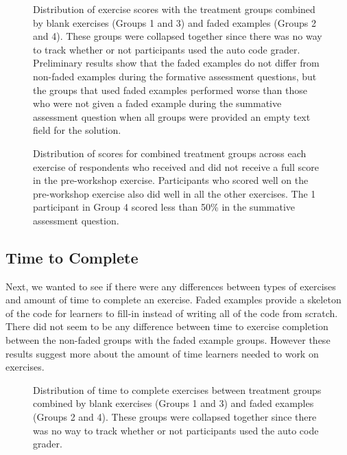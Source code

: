 \documentclass[acmsmall]{acmart}
\begin{document}
\begin{figure}[!hbtp]
	\centering
	\caption[Graded Exercise Scores with combined treatment groups]
	{Distribution of exercise scores with the treatment groups combined by
		blank exercises (Groups 1 and 3) and faded examples (Groups 2 and 4).
		These groups were collapsed together since there was no way to track whether or not
		participants used the auto code grader.
		Preliminary results show that the faded examples do not differ from non-faded examples during
		the formative assessment questions,
		but the groups that used faded examples performed worse than those who were not given a faded example
		during the summative assessment question when all groups were provided an empty text field for the solution.
	}
	\label{fig:exercise-scores-combined-treatments}
\end{figure}

\begin{figure}[!hbtp]
	\centering
	\caption[Exercise scores of full scores and non full scores in pre-workshop exercise by combined treatment]
	{Distribution of scores for combined treatment groups across each exercise of
		respondents who received and did not receive a full score in the pre-workshop exercise.
		Participants who scored well on the pre-workshop exercise also did well in all the other exercises.
		The 1 participant in Group 4 scored less than 50\% in the summative assessment question.
	}
	\label{fig:exercise-scores-combined-groups-pre100}
\end{figure}

\subsection{Time to Complete}

Next, we wanted to see if there were any differences between types of exercises and amount of time to complete an exercise.
Faded examples provide a skeleton of the code for learners to fill-in instead of writing all of the code from scratch.
There did not seem to be any difference between time to exercise completion between the non-faded groups with the
faded example groups.
However these results suggest more about the amount of time learners needed to work on exercises.

\begin{figure}[!hbtp]
	\centering
	\caption[Time to complete exercises with combined treatment groups]
	{Distribution of time to complete exercises between treatment groups combined by
		blank exercises (Groups 1 and 3) and faded examples (Groups 2 and 4).
		These groups were collapsed together since there was no way to track whether or not
		participants used the auto code grader.
	}
	\label{fig:time-to-complete-combined-treatments}
\end{figure}
\end{document}
